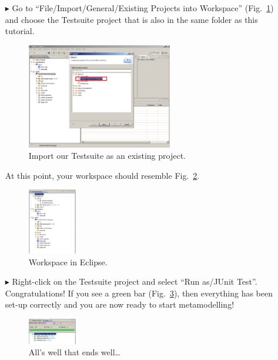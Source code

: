 \begin{enumerate}
\item[$\blacktriangleright$] Go to ``File/Import/General/Existing Projects
into Workspace'' (Fig.~\ref{fig_eclipseTestsuiteImport}) and choose the
Testsuite project that is also in the same folder as this tutorial. 
\begin{figure}[!h]
	\centering
  \includegraphics[width=0.6\textwidth]{pics/eclipse_testsuitimport.png}
	\caption{Import our Testsuite as an existing project.}
	\label{fig_eclipseTestsuiteImport}
\end{figure}

\newpage 

\item[] At this point, your workspace should resemble
Fig.~\ref{fig_eclipsepackageexplorer}.
\begin{figure}[!h]
	\centering
  \includegraphics[width=0.2\textwidth]{pics/eclipse_packageexplorer.png}
	\caption{Workspace in Eclipse.}
	\label{fig_eclipsepackageexplorer}
\end{figure}

\item[$\blacktriangleright$] Right-click on the Testsuite project and select
``Run as/JUnit Test''.
Congratulations!  If you see a green bar  (Fig.~\ref{fig_eclipsetestsuiterun}),
then everything has been set-up correctly and you are now ready to start
metamodelling!
\begin{figure}[!h]
	\centering
  \includegraphics[width=0.2\textwidth]{pics/eclipse_testsuiterun.png}
	\caption{All's well that ends well\ldots}
	\label{fig_eclipsetestsuiterun}
\end{figure}
\end{enumerate}



